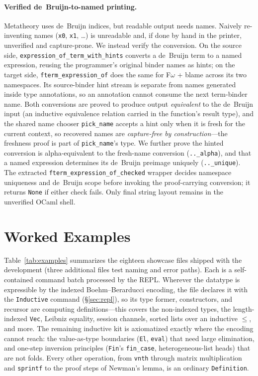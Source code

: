 \documentclass[acmsmall,anonymous=false,nonacm]{acmart}
\begin{document}
\paragraph{Verified de~Bruijn-to-named printing.}
Metatheory uses de~Bruijn indices, but readable output needs names. Naively
re-inventing names (\texttt{x0}, \texttt{x1}, \dots) is unreadable and, if done
by hand in the printer, unverified and capture-prone. We instead verify the
conversion. On the source side, \texttt{expression\_of\_term\_with\_hints}
converts a de~Bruijn term to a named expression, reusing the programmer's
original binder names as hints; on the target side,
\texttt{fterm\_expression\_of} does the same for F$\omega$ + blame across its two
namespaces. Its source-binder hint stream is separate from names generated
inside type annotations, so an annotation cannot consume the next term-binder
name. Both conversions are proved to produce output
\emph{equivalent} to the de~Bruijn input (an inductive equivalence relation
carried in the function's result type), and the shared name chooser
\texttt{pick\_name} accepts a hint only when it is fresh for the current context,
so recovered names are \emph{capture-free by construction}---the freshness proof
is part of \texttt{pick\_name}'s type. We further prove the hinted conversion is
alpha-equivalent to the fresh-name conversion (\texttt{..\_alpha}), and that a
named expression determines its de~Bruijn preimage uniquely
(\texttt{..\_unique}). The extracted
\texttt{fterm\_expression\_of\_checked} wrapper decides namespace uniqueness and
de~Bruijn scope before invoking the proof-carrying conversion; it returns
\texttt{None} if either check fails. Only final string layout remains in the
unverified OCaml shell.

\section{Worked Examples}\label{sec:examples}

Table~\ref{tab:examples} summarizes the eighteen showcase files shipped with
the development (three additional files test naming and error paths). Each is
a self-contained command batch processed by the REPL. Wherever the datatype is
expressible by the indexed Boehm--Berarducci encoding, the file declares it with
the \texttt{Inductive} command (\S\ref{sec:repl}), so its type former,
constructors, and recursor are computing definitions---this covers the
non-indexed types, the length-indexed \texttt{Vec}, Leibniz equality, session
channels, sorted lists over an inductive $\le$, and more. The remaining
inductive kit is axiomatized exactly where the encoding cannot reach: the
value-as-type boundaries (\texttt{El}, \texttt{eval}) that need large
elimination, and one-step inversion principles (\texttt{Fin}'s
\texttt{fin\_case}, heterogeneous-list heads) that are not folds. Every other
operation, from \texttt{vnth} through matrix multiplication and \texttt{sprintf}
to the proof steps of Newman's lemma, is an ordinary \texttt{Definition}.
\end{document}
